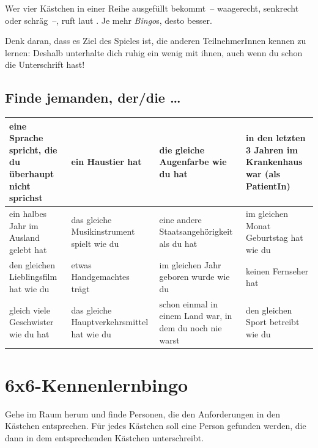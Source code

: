Wer vier Kästchen in einer Reihe ausgefüllt bekommt~-- waagerecht, senkrecht oder schräg~--, ruft laut . Je mehr \emph{Bingo}s, desto besser.

Denk daran, dass es Ziel des Spieles ist, die anderen TeilnehmerInnen kennen zu lernen: Deshalb unterhalte dich ruhig ein wenig mit ihnen, auch wenn du schon die Unterschrift hast!

\subsection*{Finde jemanden, der/die \ldots}

\renewcommand{\arraystretch}{1.27}
\noindent\begin{tabular}{|p{9.0em}|p{9.0em}|p{9.0em}|p{9.0em}|}
\hline

eine Sprache spricht, die du überhaupt nicht sprichst &
ein Haustier hat &
die gleiche Augen\-farbe wie du hat &
in den letzten 3 Jahren im Krankenhaus war (als PatientIn) \vspace{2.5em} \\
\hline

ein halbes Jahr im Ausland gelebt hat &
das gleiche Musik\-instrument spielt wie du \vspace{4.5em} &
eine andere Staatsangehörigkeit als du hat &
im gleichen Monat Geburtstag hat wie du \\
\hline

den gleichen Lieblingsfilm hat wie du &
etwas Handgemachtes trägt \vspace{5.5em} &
im gleichen Jahr geboren wurde wie du &
keinen Fernseher hat \\
\hline

gleich viele Geschwister wie du hat \vspace{5.5em} &
das gleiche Hauptverkehrsmittel hat wie du &
schon einmal in einem Land war, in dem du noch nie warst &
den gleichen Sport betreibt wie du \\
\hline
\end{tabular}
\renewcommand{\arraystretch}{1.0}

\pagebreak
\section*{6x6-Kennenlernbingo}
Gehe im Raum herum und finde Personen, die den Anforderungen in den Kästchen entsprechen. Für jedes Kästchen soll eine Person gefunden werden, die dann in dem entsprechenden Kästchen unterschreibt.

